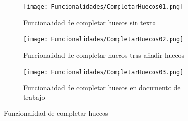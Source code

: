 \begin{figure}[ht!]
  \centering
  \begin{subfigure}{\textwidth}
    \centering
    \texttt{[image: Funcionalidades/CompletarHuecos01.png]}
    \caption{Funcionalidad de completar huecos sin texto}
    \label{fig:impcompletarhuecos01}
  \end{subfigure}

  \begin{subfigure}{\textwidth}
    \centering
    \texttt{[image: Funcionalidades/CompletarHuecos02.png]}
    \caption{Funcionalidad de completar huecos tras añadir huecos}
    \label{fig:impcompletarhuecos02}
  \end{subfigure}

  \begin{subfigure}{\textwidth}
    \centering
    \texttt{[image: Funcionalidades/CompletarHuecos03.png]}
    \caption{Funcionalidad de completar huecos en documento de trabajo}
    \label{fig:impcompletarhuecos03}
  \end{subfigure}

  \caption{Funcionalidad de completar huecos}
  \label{fig:impcompletarhuecos}
\end{figure}

